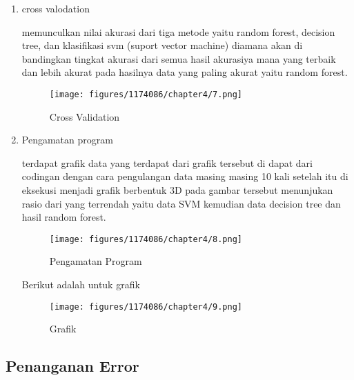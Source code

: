 \begin{enumerate}
        \item cross valodation \hfill \break 
        
        memunculkan nilai akurasi dari tiga metode yaitu random forest, decision tree, dan klasifikasi svm (suport vector machine) diamana akan di bandingkan tingkat akurasi dari semua hasil akurasiya mana yang terbaik dan lebih akurat pada hasilnya data yang paling akurat yaitu random forest.
        \begin{figure}[H]
            \texttt{[image: figures/1174086/chapter4/7.png]}
            \centering
            \caption{Cross Validation}
        \end{figure}

        \item Pengamatan program \hfill \break 
        
        terdapat grafik data yang terdapat dari grafik tersebut di dapat dari codingan dengan cara pengulangan data masing masing 10 kali setelah itu di eksekusi menjadi grafik berbentuk 3D pada gambar tersebut menunjukan rasio dari yang terrendah yaitu data SVM kemudian data decision tree dan hasil random forest.
        \begin{figure}[H]
            \texttt{[image: figures/1174086/chapter4/8.png]}
            \centering
            \caption{Pengamatan Program}
        \end{figure}

        Berikut adalah untuk grafik \hfill \break 
        \begin{figure}[H]
            \texttt{[image: figures/1174086/chapter4/9.png]}
            \centering
            \caption{Grafik}
        \end{figure}
    \end{enumerate}
    \subsection{Penanganan Error}
